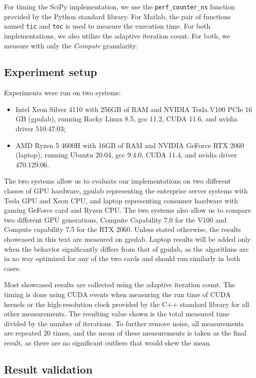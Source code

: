 For timing the SciPy implementation, we use the \texttt{perf\_counter\_ns} function provided by the Python standard library. For Matlab, the pair of functions named \texttt{tic} and \texttt{toc} is used to measure the execution time. For both implementations, we also utilize the adaptive iteration count. For both, we measure with only the \textit{Compute} granularity.


\subsection{Experiment setup}

Experiments were run on two systems:
\begin{itemize}
	\item Intel Xeon Silver 4110 with 256GB of RAM and NVIDIA Tesla V100 PCIe 16 GB (gpulab), running Rocky Linux 8.5, gcc 11.2, CUDA 11.6, and nvidia driver 510.47.03;
	\item AMD Ryzen 5 4600H with 16GB of RAM and NVIDIA GeForce RTX 2060 (laptop), running Ubuntu 20.04, gcc 9.4.0, CUDA 11.4, and nvidia driver 470.129.06.
\end{itemize}

The two systems allow us to evaluate our implementations on two different classes of GPU hardware, gpulab representing the enterprise server systems with Tesla GPU and Xeon CPU, and laptop representing consumer hardware with gaming GeForce card and Ryzen CPU. The two systems also allow us to compare two different GPU generations, Compute Capability 7.0 for the V100 and Compute capability 7.5 for the RTX 2060. Unless stated otherwise, the results showcased in this text are measured on gpulab. Laptop results will be added only when the behavior significantly differs from that of gpulab, as the algorithms are in no way optimized for any of the two cards and should run similarly in both cases. 

Most showcased results are collected using the adaptive iteration count. The timing is done using CUDA events when measuring the run time of CUDA kernels or the high-resolution clock provided by the C++ standard library for all other measurements. The resulting value shown is the total measured time divided by the number of iterations. To further remove noise, all measurements are repeated 20 times, and the mean of these measurements is taken as the final result, as there are no significant outliers that would skew the mean.



\subsection{Result validation}


